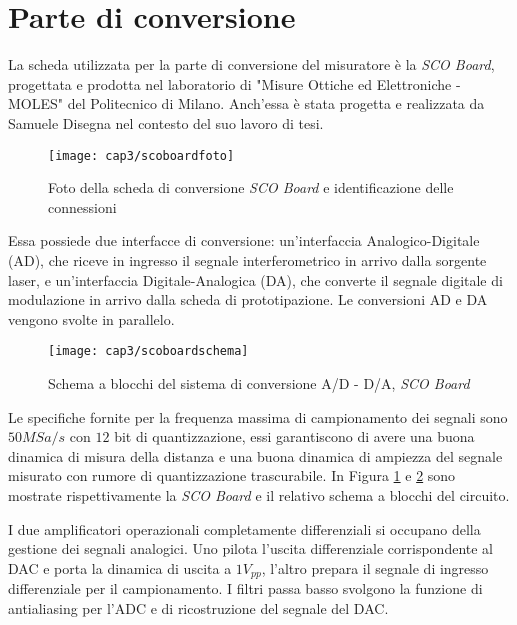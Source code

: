 \section{Parte di conversione}
La scheda utilizzata per la parte di conversione del misuratore è la \textit{SCO Board}, progettata e prodotta nel laboratorio di "Misure Ottiche ed Elettroniche - MOLES" del Politecnico di Milano. Anch'essa è stata progetta e realizzata da Samuele Disegna nel contesto del suo lavoro di tesi.
\begin{figure}[H]
  \begin{center}
    \texttt{[image: cap3/scoboardfoto]}
    \caption{Foto della scheda di conversione \textit{SCO Board} e identificazione delle connessioni}
    \label{scoboardfoto}
  \end{center}
\end{figure}

Essa possiede due interfacce di conversione: un'interfaccia Analogico-Digitale (AD), che riceve in ingresso il segnale interferometrico in arrivo dalla sorgente laser, e un'interfaccia Digitale-Analogica (DA), che converte il segnale digitale di modulazione in arrivo dalla scheda di prototipazione. Le conversioni AD e DA vengono svolte in parallelo.
\begin{figure}[H]
  \begin{center}
    \texttt{[image: cap3/scoboardschema]}
    \caption{Schema a blocchi del sistema di conversione A/D - D/A, \textit{SCO Board}}
    \label{scoboardschema}
  \end{center}
\end{figure}

Le specifiche fornite per la frequenza massima di campionamento dei segnali sono $50MSa/s$ con $12$ bit di quantizzazione, essi garantiscono di avere una buona dinamica di misura della distanza e una buona dinamica di ampiezza del segnale misurato con rumore di quantizzazione trascurabile. In Figura \ref{scoboardfoto} e \ref{scoboardschema} sono mostrate rispettivamente la \textit{SCO Board} e il relativo schema a blocchi del circuito.

I due amplificatori operazionali completamente differenziali si occupano della gestione dei segnali analogici. Uno pilota l'uscita differenziale corrispondente al DAC e porta la dinamica di uscita a $1V_{pp}$, l'altro prepara il segnale di ingresso differenziale per il campionamento. I filtri passa basso svolgono la funzione di antialiasing per l'ADC e di ricostruzione del segnale del DAC.

